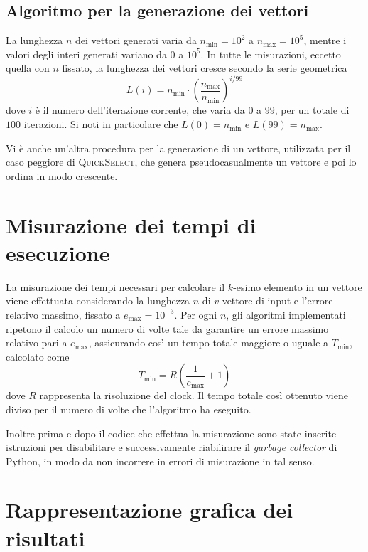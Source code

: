 \documentclass[a4paper,12pt]{article}
\newcommand{\QuickSelect}{\textsc{QuickSelect}}
\begin{document}
\subsection{Algoritmo per la generazione dei vettori}
La lunghezza $n$ dei vettori generati varia da $n_{\min}=10^2$ a $n_{\max}=10^5$, mentre i valori degli interi generati variano da $0$ a $10^5$.
In tutte le misurazioni, eccetto quella con $n$ fissato, la lunghezza dei vettori cresce secondo la serie geometrica
\[
    L(i) = n_{\min} \cdot \left(\frac{n_{\max}}{n_{\min}}\right)^{i/99}
\]
dove $i$ è il numero dell'iterazione corrente, che varia da $0$ a $99$, per un totale di $100$ iterazioni.
Si noti in particolare che $L(0) = n_{\min}$ e $L(99) = n_{\max}$.

Vi è anche un'altra procedura per la generazione di un vettore, utilizzata per il caso peggiore di \QuickSelect{}, che genera pseudocasualmente un vettore e poi lo ordina in modo crescente.


\section{Misurazione dei tempi di esecuzione}
\label{sec:misurazione}
La misurazione dei tempi necessari per calcolare il $k$-esimo elemento in un vettore viene effettuata considerando la lunghezza \( n \) di $v$ vettore di input e l'errore relativo massimo, fissato a $e_{\max} = 10^{-3}$.
Per ogni $n$, gli algoritmi implementati ripetono il calcolo un numero di volte tale da garantire un errore massimo relativo pari a  $e_{\max}$, assicurando così un tempo totale maggiore o uguale a \( T_{\min} \), calcolato come \[ T_{\min} = R \left( \frac{1}{e_{\max}} + 1 \right) \] dove \( R \) rappresenta la risoluzione del clock.
Il tempo totale così ottenuto viene diviso per il numero di volte che l'algoritmo ha eseguito.

Inoltre prima e dopo il codice che effettua la misurazione sono state inserite istruzioni per disabilitare e successivamente riabilirare il \emph{garbage collector} di Python, in modo da non incorrere in errori di misurazione in tal senso.


\newpage

\section{Rappresentazione grafica dei risultati}
\label{sec:grafici}
\end{document}
